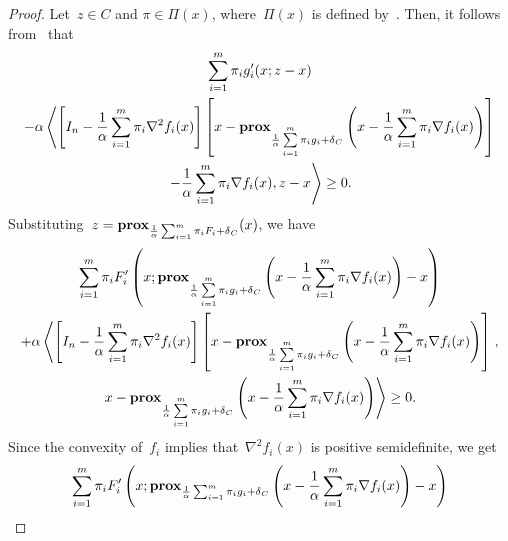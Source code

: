 \documentclass[../../main]{subfiles}
\begin{document}
                        \begin{proof}
                            Let~$z \in C$ and $\pi \in \Pi(x)$, where~$\Pi(x)$ is defined by~.
                            Then, it follows from~ that
                            \begin{multline}
                                \sum_{i = 1}^{m} \pi_i g_i'(x; z - x) \\
                                - \alpha \left\langle \left[ I_n - \frac{1}{\alpha} \sum_{i = 1}^{m} \pi_i \nabla^2 f_i(x) \right] \left[x - \operatorname{\mathbf{prox}}_{\frac{1}{\alpha} \sum\limits_{i = 1}^{m} \pi_i g_i + \operatorname{\delta}_C} \left( x - \frac{1}{\alpha} \sum_{i = 1}^{m} \pi_i \nabla f_i(x) \right) \right] \right.\\
                                \left. - \frac{1}{\alpha} \sum_{i = 1}^{m} \pi_i \nabla f_i(x) , z - x \right\rangle \ge 0
                            .\end{multline}
                            Substituting~$z = \operatorname{\mathbf{prox}}_{\frac{1}{\alpha} \sum_{i = 1}^{m} \pi_i F_i + \operatorname{\delta}_C}(x)$, we have
                            \begin{multline}
                                \sum_{i = 1}^{m} \pi_i F_i' \left(x; \operatorname{\mathbf{prox}}_{\frac{1}{\alpha} \sum\limits_{i = 1}^{m} \pi_i g_i + \operatorname{\delta}_C}\left( x - \frac{1}{\alpha} \sum_{i = 1}^{m} \pi_i \nabla f_i(x) \right) - x \right) \\
                                + \alpha \left\langle \left[ I_n - \frac{1}{\alpha} \sum_{i = 1}^{m} \pi_i \nabla^2 f_i(x) \right] \left[ x - \operatorname{\mathbf{prox}}_{\frac{1}{\alpha} \sum\limits_{i = 1}^{m} \pi_i g_i + \operatorname{\delta}_C}\left( x - \frac{1}{\alpha} \sum_{i = 1}^{m} \pi_i \nabla f_i(x) \right) \right]  \right. , \\
                                \left. x - \operatorname{\mathbf{prox}}_{\frac{1}{\alpha} \sum\limits_{i = 1}^{m} \pi_i g_i + \operatorname{\delta}_C}\left( x - \frac{1}{\alpha} \sum_{i = 1}^{m} \pi_i \nabla f_i(x) \right) \right\rangle \ge 0
                            .\end{multline}
                            Since the convexity of~$f_i$ implies that~$\nabla^2 f_i(x)$ is positive semidefinite, we get
                            \begin{multline}
                                \sum_{i = 1}^{m} \pi_i F_i' \left(x; \prox_{\frac{1}{\alpha} \sum_{i = 1}^{m} \pi_i g_i + \indicator_C}\left( x - \frac{1}{\alpha} \sum_{i = 1}^{m} \pi_i \nabla f_i(x) \right) - x \right) \\

\end{multline}
\end{proof}
\end{document}
